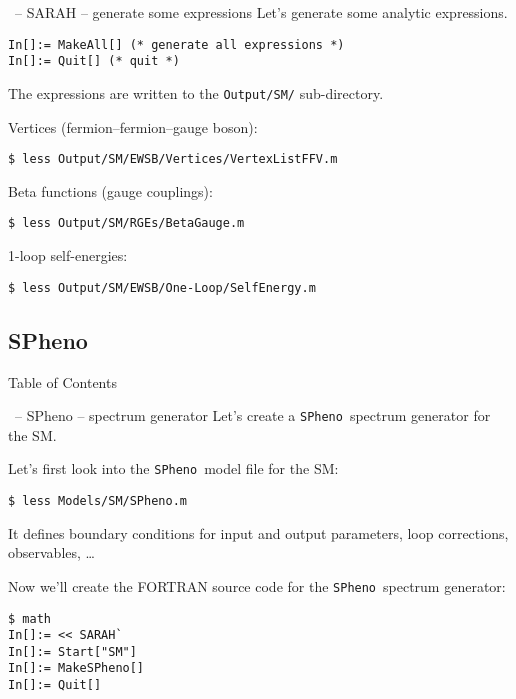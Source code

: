 \documentclass[11pt]{beamer}
\newcommand{\SPheno}{\texttt{SPheno}}
\begin{document}

\begin{frame}[fragile]{\insertsection\ -- SARAH -- generate some expressions}
  Let's  generate some analytic expressions.
  \begin{lstlisting}
In[]:= MakeAll[] (* generate all expressions *)
In[]:= Quit[] (* quit *)\end{lstlisting}
  The expressions are written to the \texttt{Output/SM/} sub-directory.

  \medskip

  Vertices (fermion--fermion--gauge boson):
  \begin{lstlisting}
$ less Output/SM/EWSB/Vertices/VertexListFFV.m\end{lstlisting}%
  Beta functions (gauge couplings):
  \begin{lstlisting}
$ less Output/SM/RGEs/BetaGauge.m\end{lstlisting}%
  1-loop self-energies:
  \begin{lstlisting}
$ less Output/SM/EWSB/One-Loop/SelfEnergy.m\end{lstlisting}%
\end{frame}


\subsection{SPheno}


\begin{frame}{Table of Contents}
\end{frame}


\begin{frame}[fragile]{\insertsection\ -- SPheno -- spectrum generator}
  Let's create a \SPheno\ spectrum generator for the SM.

  \bigskip

  Let's first look into the \SPheno\ model file for the SM:
  \begin{lstlisting}
$ less Models/SM/SPheno.m\end{lstlisting}%
  It defines boundary conditions for input and output parameters, loop
  corrections, observables, \ldots

  \bigskip

  Now we'll create the FORTRAN source code for the \SPheno\ spectrum
  generator:
  \begin{lstlisting}
$ math
In[]:= << SARAH`
In[]:= Start["SM"]
In[]:= MakeSPheno[]
In[]:= Quit[]\end{lstlisting}%

\end{frame}
\end{document}
